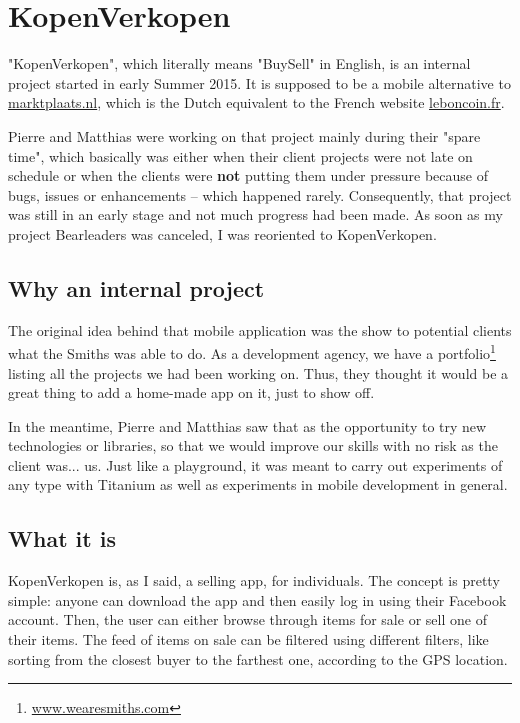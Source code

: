 \chapter{KopenVerkopen}\label{kvk}

"KopenVerkopen", which literally means "BuySell" in English, is an internal project started in early Summer 2015. It is supposed to be a mobile alternative to \href{http://www.marktplaats.nl/}{marktplaats.nl}, which is the Dutch equivalent to the French website \href{http://www.leboncoin.fr/}{leboncoin.fr}.

\medskip

Pierre and Matthias were working on that project mainly during their "spare time", which basically was either when their client projects were not late on schedule or when the clients were \textbf{not} putting them under pressure because of bugs, issues or enhancements -- which happened rarely. Consequently, that project was still in an early stage and not much progress had been made. As soon as my project Bearleaders was canceled, I was reoriented to KopenVerkopen.

\section{Why an internal project}

The original idea behind that mobile application was the show to potential clients what the Smiths was able to do. As a development agency, we have a portfolio\footnote{\href{http://www.wearesmiths.com/}{www.wearesmiths.com}} listing all the projects we had been working on. Thus, they thought it would be a great thing to add a home-made app on it, just to show off.

\medskip

In the meantime, Pierre and Matthias saw that as the opportunity to try new technologies or libraries, so that we would improve our skills with no risk as the client was... us. Just like a playground, it was meant to carry out experiments of any type with Titanium as well as experiments in mobile development in general.

\section{What it is}

KopenVerkopen is, as I said, a selling app, for individuals. The concept is pretty simple: anyone can download the app and then easily log in using their Facebook account. Then, the user can either browse through items for sale or sell one of their items. The feed of items on sale can be filtered using different filters, like sorting from the closest buyer to the farthest one, according to the GPS location.

